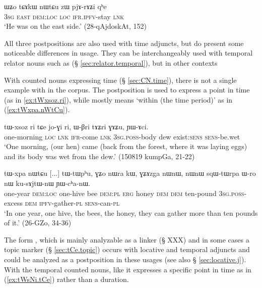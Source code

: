  \begin{exe}
\ex \label{ex:tCAkW.nWtCu.zW}
\gll   ɯʑo tɕɤkɯ nɯtɕu zɯ pjɤ-rɤʑi qʰe \\
\textsc{3sg} \textsc{east} \textsc{dem}:\textsc{loc} \textsc{loc} \textsc{ifr}.\textsc{ipfv}-stay \textsc{lnk}  \\
\glt `He was on the east side.' (28-qAjdoskAt, 152)
  \end{exe}
   
All three postpositions are also used with time adjuncts, but do present some noticeable differences in usage. They can be interchangeably used with temporal relator nouns such as  (§ \ref{sec:relator.temporal}), but in other contexts 

With counted nouns expressing time (§ \ref{sec:CN.time}), there is not a single example with  in the corpus. The postposition  is used to express a point in time  (as in \ref{ex:tWxsoz.ri}), while  mostly means `within (the time period)' as in (\ref{ex:tWxpa.nWtCu}).  

\begin{exe}
\ex \label{ex:tWxsoz.ri}
\gll tɯ-xsoz ri tɕe jo-ɣi ri, ɯ-βri tɤʑri ɣɤʑu, ɲɯ-ɤci. \\
one-morning \textsc{loc} \textsc{lnk} \textsc{ifr}-come \textsc{lnk} \textsc{3sg}.\textsc{poss}-body dew exist:\textsc{sens} \textsc{sens}-be.wet \\
\glt `One morning, (our hen) came (back from the forest, where it was laying eggs) and its body was wet from the dew.' (150819 kumpGa, 21-22)
\end{exe}

\begin{exe}
\ex \label{ex:tWxpa.nWtCu}
\gll  tɯ-xpa nɯtɕu [...] tɯ-tɯpʰu, ɣʑo nɯra kɯ, ɣʑɤzga nɯnɯ, nɯnɯ sqɯ-tɯrpa ɯ-ro nɯ ku-sɤjtɯ-nɯ ɲɯ-cʰa-nɯ. \\
one-year \textsc{dem}:\textsc{loc} { } one-hive bee \textsc{dem}:\textsc{pl} \textsc{erg} honey \textsc{dem} \textsc{dem} ten-pound \textsc{3sg}.\textsc{poss}-excess \textsc{dem} \textsc{ipfv}-gather-\textsc{pl} \textsc{sens}-can-\textsc{pl} \\
\glt  `In one year, one hive, the bees, the honey, they can gather more than ten pounds of it.' (26-GZo, 34-36)
\end{exe}

The form , which  is mainly analyzable as a linker (§ XXX) and in some cases a topic marker (§ \ref{sec:tCe.topic}) occurs with locative and temporal adjuncts and could be analyzed as a postposition in these usages (see also § \ref{sec:locative.j}). With the temporal counted nouns, like  it expresses a specific point in time as in (\ref{ex:tWsNi.tCe}) rather than a duration.

